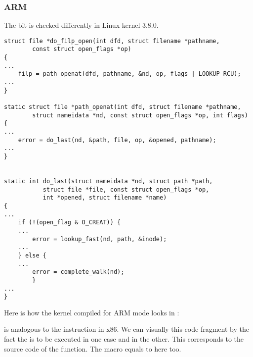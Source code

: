 \subsubsection{ARM}


The  bit is checked differently in Linux kernel 3.8.0.

\begin{lstlisting}[caption=linux kernel 3.8.0]
struct file *do_filp_open(int dfd, struct filename *pathname,
		const struct open_flags *op)
{
...
	filp = path_openat(dfd, pathname, &nd, op, flags | LOOKUP_RCU);
...
}

static struct file *path_openat(int dfd, struct filename *pathname,
		struct nameidata *nd, const struct open_flags *op, int flags)
{
...
	error = do_last(nd, &path, file, op, &opened, pathname);
...
}


static int do_last(struct nameidata *nd, struct path *path,
		   struct file *file, const struct open_flags *op,
		   int *opened, struct filename *name)
{
...
	if (!(open_flag & O_CREAT)) {
    ...
		error = lookup_fast(nd, path, &inode);
    ...
	} else {
    ...
		error = complete_walk(nd);
        }
...
}
\end{lstlisting}

Here is how the kernel compiled for ARM mode looks in \IDA:



 is analogous to the \TEST instruction in x86.
We can  visually this code fragment by the fact the 
 is to be executed in one case and  in the other.
This corresponds to the source code of the  function.
The  macro equals to  here too.

